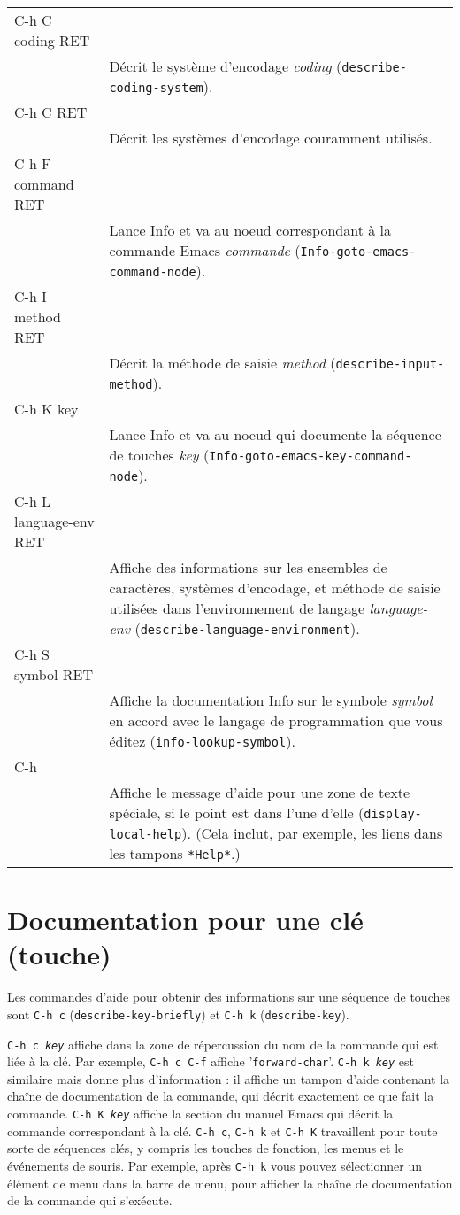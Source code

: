 \begin{longtable}[m]{>{\ttfamily}lp{9cm}}
  C-h C coding RET & \\
  & Décrit le système d'encodage \textit{coding}
  (\texttt{describe-coding-system}). \\
  C-h C RET & \\
  & Décrit les systèmes d'encodage couramment utilisés. \\
  \endfoot
  C-h F command RET & \\
  & Lance Info et va au noeud correspondant à la commande Emacs
  \textit{commande} (\texttt{Info-goto-emacs-command-node}). \\
  C-h I method RET & \\
  & Décrit la méthode de saisie \textit{method}
  (\texttt{describe-input-method}). \\
  C-h K key & \\
  & Lance Info et va au noeud qui documente la séquence de touches
  \textit{key} (\texttt{Info-goto-emacs-key-command-node}). \\
  C-h L language-env RET & \\
  & Affiche des informations sur les ensembles de caractères, systèmes
  d'encodage, et méthode de saisie utilisées dans l'environnement de
  langage \textit{language-env}
  (\texttt{describe-language-environment}). \\
  C-h S symbol RET & \\
  & Affiche la documentation Info sur le symbole \textit{symbol} en
  accord avec le langage de programmation que vous éditez
  (\texttt{info-lookup-symbol}). \\
  \endlastfoot
  C-h & \\
  & Affiche le message d'aide pour une zone de texte spéciale, si le
  point est dans l'une d'elle (\texttt{display-local-help}). (Cela
  inclut, par exemple, les liens dans les tampons \texttt{*Help*}.)
\end{longtable}

\section{Documentation pour une clé (touche)}
Les commandes d'aide pour obtenir des informations sur une séquence de
touches sont \texttt{C-h c} (\texttt{describe-key-briefly}) et
\texttt{C-h k} (\texttt{describe-key}).

\texttt{C-h c \textit{key}} affiche dans la zone de répercussion du
nom de la commande qui est liée à la clé. Par exemple, \texttt{C-h c
  C-f} affiche '\texttt{forward-char}'. 
\texttt{C-h k \textit{key}} est similaire mais donne plus
d'information : il affiche un tampon d'aide contenant la chaîne de
documentation de la commande, qui décrit exactement ce que fait la
commande.
\texttt{C-h K \textit{key}} affiche la section du manuel Emacs qui
décrit la commande correspondant à la clé.
\texttt{C-h c}, \texttt{C-h k} et \texttt{C-h K} travaillent pour
toute sorte de séquences clés, y compris les touches de fonction, les
menus et le événements de souris. Par exemple, après \texttt{C-h k}
vous pouvez sélectionner un élément de menu dans la barre de menu,
pour afficher la chaîne de documentation de la commande qui s'exécute.

